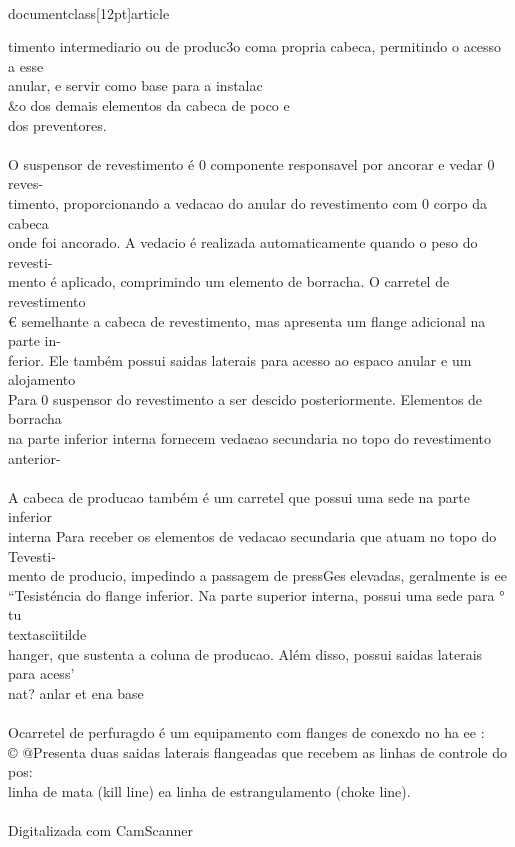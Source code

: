 \\documentclass[12pt]{article}
\begin{document}
timento intermediario ou de produc3o coma propria cabeca, permitindo o acesso a esse\\
anular, e servir como base para a instalac\\&o dos demais elementos da cabeca de poco e\\
dos preventores.\\
\\
O suspensor de revestimento é 0 componente responsavel por ancorar e vedar 0 reves-\\
timento, proporcionando a vedacao do anular do revestimento com 0 corpo da cabeca\\
onde foi ancorado. A vedacio é realizada automaticamente quando o peso do revesti-\\
mento é aplicado, comprimindo um elemento de borracha. O carretel de revestimento\\
€ semelhante a cabeca de revestimento, mas apresenta um flange adicional na parte in-\\
ferior. Ele também possui saidas laterais para acesso ao espaco anular e um alojamento\\
Para 0 suspensor do revestimento a ser descido posteriormente. Elementos de borracha\\
na parte inferior interna fornecem veda¢ao secundaria no topo do revestimento anterior-\\
\\
A cabeca de producao também é um carretel que possui uma sede na parte inferior\\
interna Para receber os elementos de vedacao secundaria que atuam no topo do Tevesti-\\
mento de producio, impedindo a passagem de pressGes elevadas, geralmente is ee\\
“Tesisténcia do flange inferior. Na parte superior interna, possui uma sede para ° tu \\textasciitilde{}\\
hanger, que sustenta a coluna de producao. Além disso, possui saidas laterais para acess'\\
nat? anlar et ena base\\
\\
Ocarretel de perfuragdo é um equipamento com flanges de conexdo no ha ee :\\
© @Presenta duas saidas laterais flangeadas que recebem as linhas de controle do pos:\\
linha de mata (kill line) ea linha de estrangulamento (choke line).\\
\\
Digitalizada com CamScanner\\
\end{document}
